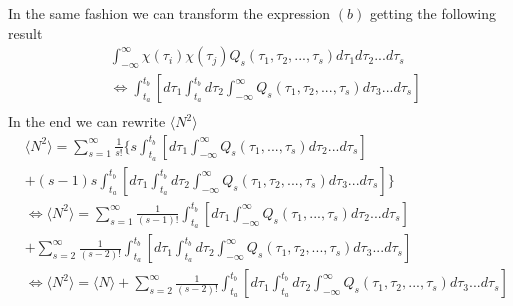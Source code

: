 In the same fashion we can transform the expression $(b)$ getting the following result
\begin{equation}
\begin{split}
& \int_{-\infty}^{\infty}\chi(\tau_i)\chi(\tau_j)Q_s(\tau_1,\tau_2,...,\tau_s)d\tau_1d\tau_2...d\tau_s \\
& \Leftrightarrow \int_{t_a}^{t_b}\left[d\tau_1\int_{t_a}^{t_b}d\tau_2\int_{-\infty}^{\infty}Q_s(\tau_1,\tau_2,...,\tau_s)d\tau_3...d\tau_s\right] \\
\end{split}
\end{equation}
In the end we can rewrite $\langle N^2 \rangle$
\begin{equation}
\begin{split}
&\langle N^2 \rangle=\sum_{s=1}^{\infty}\frac{1}{s!}\{s\int_{t_a}^{t_b}\left[d\tau_1 \int_{-\infty}^{\infty}Q_s(\tau_1,...,\tau_s)d\tau_2...d\tau_s\right] \\
& +(s-1)s\int_{t_a}^{t_b}\left[d\tau_1\int_{t_a}^{t_b}d\tau_2\int_{-\infty}^{\infty}Q_s(\tau_1,\tau_2,...,\tau_s)d\tau_3...d\tau_s\right] \} \\
&\Leftrightarrow \langle N^2 \rangle=\sum_{s=1}^{\infty}\frac{1}{(s-1)!}\int_{t_a}^{t_b}\left[d\tau_1 \int_{-\infty}^{\infty}Q_s(\tau_1,...,\tau_s)d\tau_2...d\tau_s\right]\\
& +\sum_{s=2}^{\infty}\frac{1}{(s-2)!}\int_{t_a}^{t_b}\left[d\tau_1\int_{t_a}^{t_b}d\tau_2\int_{-\infty}^{\infty}Q_s(\tau_1,\tau_2,...,\tau_s)d\tau_3...d\tau_s\right] \\
& \Leftrightarrow \langle N^2 \rangle=\langle N \rangle+\sum_{s=2}^{\infty}\frac{1}{(s-2)!}\int_{t_a}^{t_b}\left[d\tau_1\int_{t_a}^{t_b}d\tau_2\int_{-\infty}^{\infty}Q_s(\tau_1,\tau_2,...,\tau_s)d\tau_3...d\tau_s\right] \\
\end{split}
\end{equation}